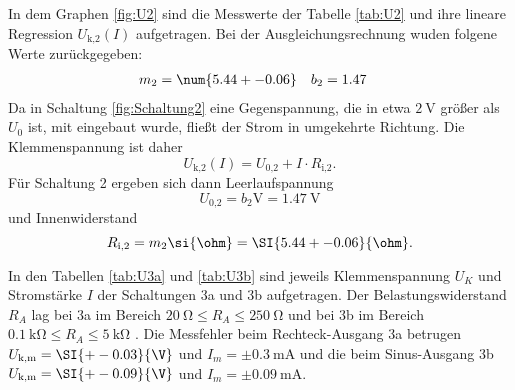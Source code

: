   In dem Graphen \ref{fig:U2} sind die Messwerte der Tabelle
  \ref{tab:U2} und ihre lineare Regression
  $U_\text{k,2}(I)$ aufgetragen.
  Bei der Ausgleichungsrechnung wuden folgene Werte zurückgegeben:
  \begin{align}
    m_2 & = \num{5.44 +- 0.06} & b_2 & = 1.47
  \end{align}
  Da in Schaltung \ref{fig:Schaltung2} eine Gegenspannung, die in etwa $\SI{2}{\V}$ größer als
  $U_0$ ist, mit eingebaut wurde, fließt der Strom in umgekehrte Richtung.
  Die Klemmenspannung ist daher
  \begin{equation}
    U_\text{k,2}(I) = U_\text{0,2} + I \cdot R_\text{i,2}.
  \end{equation}
  Für Schaltung 2 ergeben sich dann Leerlaufspannung
  \begin{equation}
    U_\text{0,2} = b_2 \si{\V} = \SI{1.47}{\V}
  \end{equation}
  und Innenwiderstand
  \begin{equation}
    R_\text{i,2} = m_2 \si{\ohm} = \SI{5.44 +- 0.06}{\ohm}.
  \end{equation}

  \newpage

  In den Tabellen \ref{tab:U3a} und \ref{tab:U3b} sind jeweils
  Klemmenspannung $U_K$ und Stromstärke $I$
  der Schaltungen 3a und 3b aufgetragen. Der Belastungswiderstand $R_A$
  lag bei 3a im Bereich $ \SI{20}{\ohm} \leq R_A \leq \SI{250}{\ohm} $ und bei
  3b im Bereich $ \SI{0.1}{\kilo\ohm} \leq R_A \leq \SI{5}{\kilo\ohm} $ .
  Die Messfehler beim Rechteck-Ausgang 3a betrugen
  $U_\text{k,m} = \SI{+-0.03}{\V}$ und $I_m = \pm \SI{0.3}{\milli\A}$ und die
  beim Sinus-Ausgang 3b $U_\text{k,m} = \SI{+-0.09}{\V}$ und
  $I_m = \pm \SI{0.09}{\milli\A}$.

